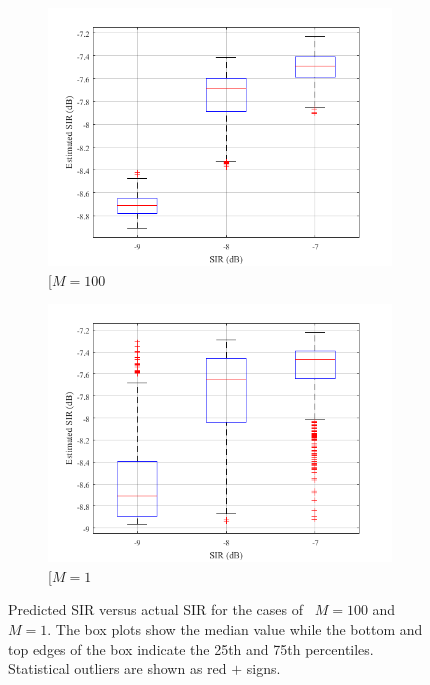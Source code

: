 \documentclass{article}
\begin{document}
		\begin{figure}[!ht]
			\begin{subfigure}{.5\linewidth}
				\centering
				\includegraphics[width=.99\linewidth]{images/BP_1}  
				\caption{[$M=100$}
				\label{ftml-conf:fig:results-BP-1}
			\end{subfigure}
			\begin{subfigure}{.5\linewidth}
				\centering
				\includegraphics[width=.99\linewidth]{images/BP_2}  
				\caption{[$M=1$}
				\label{ftml-conf:fig:results-BP-2}
			\end{subfigure}
			\caption{Predicted SIR versus actual SIR for the cases of~\protect{} $M=100$ and~\protect{} $M=1$. The box plots show the median value while the bottom and top edges of the box indicate the 25th and 75th percentiles.  Statistical outliers are shown as red $+$ signs.}
			\label{ftml-conf:fig:results-BP}
		\end{figure}
	
	
\end{document}

